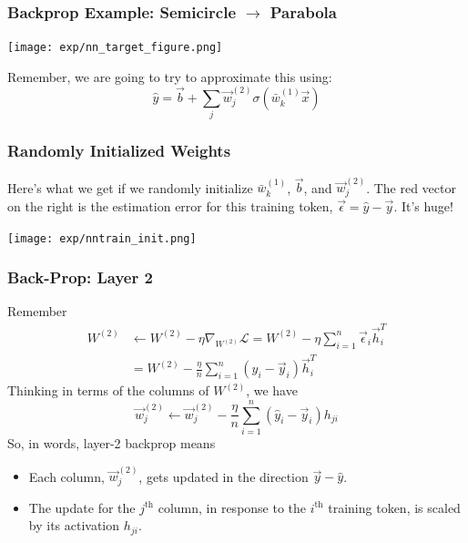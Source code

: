 \documentclass{beamer}
\begin{document}
\begin{frame}
  \frametitle{Backprop Example: Semicircle $\rightarrow$ Parabola}

  \centerline{\texttt{[image: exp/nn\_target\_figure.png]}}

  Remember, we are going to try to approximate this using:
  \[
  \hat{y} = \vec{b} + \sum_j \vec{w}_{j}^{(2)} \sigma\left(\bar{w}_{k}^{(1)} \vec{x}\right)
  \]
\end{frame}

\begin{frame}
  \frametitle{Randomly Initialized Weights}

  Here's what we get if we randomly initialize $\bar{w}_k^{(1)}$,
  $\vec{b}$, and $\vec{w}_j^{(2)}$.  The red vector on the right is
  the estimation error for this training token,
  $\vec\epsilon=\hat{y}-\vec{y}$.  It's huge!
  \centerline{\texttt{[image: exp/nntrain\_init.png]}}
\end{frame}

\begin{frame}
  \frametitle{Back-Prop: Layer 2}
  Remember
  \begin{align*}
    W^{(2)} &\leftarrow W^{(2)}-\eta\nabla_{W^{(2)}}{\mathcal L}
    = W^{(2)}-\eta\sum_{i=1}^n \vec\epsilon_i\vec{h}_i^T\\
    &= W^{(2)}-\frac{\eta}{n}\sum_{i=1}^n \left(\hat{y}_i-\vec{y}_i\right)\vec{h}_i^T
  \end{align*}
  Thinking in terms of the columns of $W^{(2)}$, we have
  \[
  \vec{w}_j^{(2)} \leftarrow
  \vec{w}_j^{(2)}-\frac{\eta}{n}\sum_{i=1}^n \left(\hat{y}_i-\vec{y}_i\right)h_{ji}
  \]
  So, in words, layer-2 backprop means
  \begin{itemize}
  \item Each column, $\vec{w}_j^{(2)}$, gets updated in the direction
    $\vec{y}-\hat{y}$.
  \item The update for the $j^{\textrm{th}}$ column, in response to
    the $i^{\textrm{th}}$ training token, is scaled by its
    activation $h_{ji}$.
  \end{itemize}
\end{frame}
\end{document}
